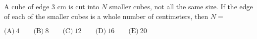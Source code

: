 

A cube of edge $3$ cm is cut into $N$ smaller cubes, not all the same size. If the edge of each of the smaller cubes is a whole number of centimeters, then $N=$

$\text{(A)}\ 4 \qquad \text{(B)}\ 8 \qquad \text{(C)}\ 12 \qquad \text{(D)}\ 16 \qquad \text{(E)}\ 20$
